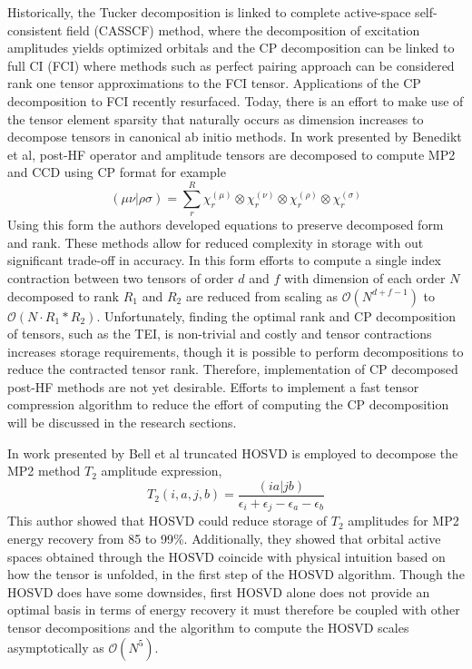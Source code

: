 	  Historically, the Tucker decomposition is linked to complete active-space self-consistent field (CASSCF) method\cite{Roos1980}, where the decomposition of excitation amplitudes yields optimized orbitals and the CP decomposition can be linked to full CI\cite{Bell2010} (FCI) where methods such as perfect pairing approach can be considered rank one tensor approximations to the FCI tensor. Applications of the CP decomposition to FCI recently resurfaced\cite{Uemura2012,Bohm2016}. %
	  Today, there is an effort to make use of the tensor element sparsity that naturally occurs as dimension increases to decompose tensors in canonical ab initio methods. In work presented by Benedikt et al\cite{Benedikt2011,Benedikt2013,Benedikt2013a,Benedikt2014}, post-HF operator and amplitude tensors are decomposed to compute MP2 and CCD using CP format for example
	  	\begin{equation}
	  		(\mu\nu|\rho\sigma) = \sum_r^R \chi^{(\mu)}_r \otimes \chi^{(\nu)}_r \otimes \chi^{(\rho)}_r \otimes \chi^{(\sigma)}_r
	  	\end{equation}
	  Using this form the authors developed equations to preserve decomposed form and rank. These methods allow for reduced complexity in storage with out significant trade-off in accuracy. In this form efforts to compute a single index contraction between two tensors of order $d$ and $f$ with dimension of each order $N$ decomposed to rank $R_1$ and $R_2$ are reduced from scaling as $\mathcal{O}(N^{d + f -1})$ to $\mathcal{O}(N \cdot R_1 * R_2)$. 
	  Unfortunately, finding the optimal rank and CP decomposition of tensors, such as the TEI, is non-trivial and costly and tensor contractions increases storage requirements, though it is possible to perform decompositions to reduce the contracted tensor rank. Therefore, implementation of CP decomposed post-HF methods are not yet desirable.  Efforts to implement a fast tensor compression algorithm to reduce the effort of computing the CP decomposition will be discussed in the research sections.

	  In work presented by Bell et al\cite{Bell2010} truncated HOSVD is employed to decompose the MP2 method $T_2$ amplitude expression, 
	  	\begin{equation}
	  		T_2(i,a,j,b) = \frac{(ia|jb)}{\epsilon_i + \epsilon_j - \epsilon_a - \epsilon_b}
	  	\end{equation}
	  This author showed that HOSVD could reduce storage of $T_2$ amplitudes for MP2 energy recovery from 85 to 99\%. Additionally, they showed that orbital active spaces obtained through the HOSVD coincide with physical intuition based on how the tensor is unfolded, in the first step of the HOSVD algorithm. Though the HOSVD does have some downsides, first HOSVD alone does not provide an optimal basis in terms of energy recovery it must therefore be coupled with other tensor decompositions and the algorithm to compute the HOSVD scales asymptotically as $\mathcal{O}(N^5)$\cite{Bell2010}.
